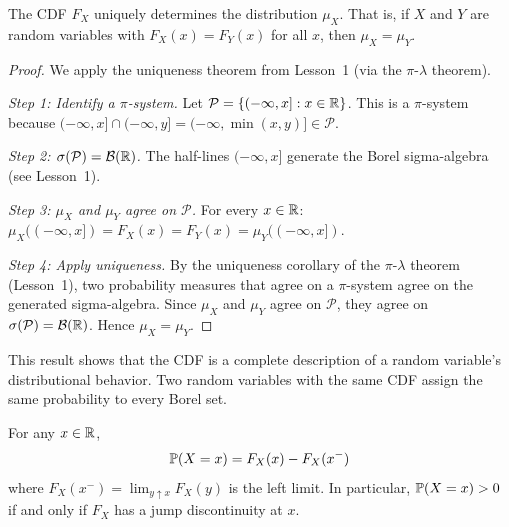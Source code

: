 \documentclass[11pt,a4paper]{article}
\begin{document}
\begin{keyresult}[title={CDF Determines Distribution}]
\begin{proposition}
\label{prop:cdf_determines}
The CDF $F_X$ uniquely determines the distribution $\mu_X$. That is, if
$X$ and $Y$ are random variables with $F_X(x) = F_Y(x)$ for all $x$,
then $\mu_X = \mu_Y$.
\end{proposition}
\end{keyresult}

\begin{proof}
We apply the uniqueness theorem from Lesson~1 (via the
$\pi$-$\lambda$ theorem).

\textit{Step 1: Identify a $\pi$-system.}
Let $\mathcal{P} = \{(-\infty, x] : x \in \mathbb{R}\}$. This is a $\pi$-system
because $(-\infty, x] \cap (-\infty, y] = (-\infty, \min(x,y)] \in
\mathcal{P}$.

\textit{Step 2: $\sigma(\mathcal{P}) = \mathcal{B}(\mathbb{R})$.}
The half-lines $(-\infty, x]$ generate the Borel sigma-algebra
(see Lesson~1).

\textit{Step 3: $\mu_X$ and $\mu_Y$ agree on $\mathcal{P}$.}
For every $x \in \mathbb{R}$:
$\mu_X((-\infty, x]) = F_X(x) = F_Y(x) = \mu_Y((-\infty, x])$.

\textit{Step 4: Apply uniqueness.}
By the uniqueness corollary of the $\pi$-$\lambda$ theorem (Lesson~1),
two probability measures that agree on a $\pi$-system agree on the
generated sigma-algebra. Since $\mu_X$ and $\mu_Y$ agree on $\mathcal{P}$,
they agree on $\sigma(\mathcal{P}) = \mathcal{B}(\mathbb{R})$. Hence $\mu_X = \mu_Y$.
\end{proof}

\begin{remark}
This result shows that the CDF is a complete description of a random
variable's distributional behavior. Two random variables with the same
CDF assign the same probability to every Borel set.
\end{remark}

\begin{proposition}
\label{prop:cdf_point_mass}
For any $x \in \mathbb{R}$,
\begin{equation}
  \mathbb{P}(X = x) = F_X(x) - F_X(x^-)
  \label{eq:cdf_jump}
\end{equation}
where $F_X(x^-) = \lim_{y \uparrow x} F_X(y)$ is the left limit.
In particular, $\mathbb{P}(X = x) > 0$ if and only if $F_X$ has a jump
discontinuity at $x$.
\end{proposition}
\end{document}
